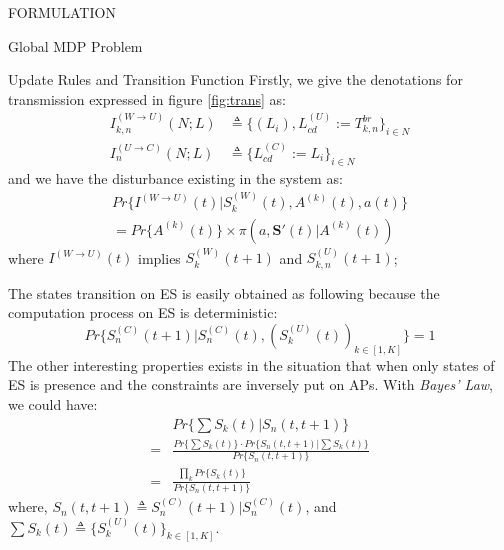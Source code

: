 \documentclass[10pt, conference, letterpaper]{IEEEtran}
\begin{document}
\begin{section}{FORMULATION}
\begin{subsection}{Global MDP Problem}
\begin{subsubsection}{Update Rules and Transition Function}
                Firstly, we give the denotations for transmission expressed in figure \ref{fig:trans} as:
                \begin{align}
                    I^{(W \to U)}_{k,n}(N;L) &\triangleq \{ (L_i),L^{(U)}_{cd}:=T^{br}_{k,n} \}_{i \in N}
                        \\
                    I^{(U \to C)}_{n}(N;L) &\triangleq \{ L^{(C)}_{cd}:=L_i \}_{i \in N}
                \end{align}
                and we have the disturbance existing in the system as:
                \begin{gather*}
                    Pr\{ I^{(W \to U)}(t) | S_{k}^{(W)}(t),A^{(k)}(t), a(t) \}
                    \\
                        = Pr\{ A^{(k)}(t) \} \times \pi(a, \mathbf{S}'(t)|A^{(k)}(t))
                \end{gather*}
                where $I^{(W \to U)}(t)$ implies $S^{(W)}_{k}(t+1)$ and $S^{(U)}_{k,n}(t+1)$;

                The states transition on ES is easily obtained as following because the computation process on ES is deterministic:
                $$
                Pr\{S_{n}^{(C)}(t+1) |S_{n}^{(C)}(t), (S_{k}^{(U)}(t))_{k \in [1,K]}  \} = 1
                $$
                The other interesting properties exists in the situation that when only states of ES is presence and the constraints are inversely put on APs. With \emph{Bayes' Law}, we could have:
                \begin{align*}
                    & Pr\{ \sum{S_k(t)} | S_n(t,t+1) \} \\
                    =& \frac{ Pr\{\sum{S_k(t)}\} \cdot Pr\{S_n(t,t+1)|\sum{S_k(t)}\} }{ Pr\{S_n(t,t+1)\} } \\
                    =& \frac{
                            \prod_k Pr\{S_k(t)\}
                        }{
                            Pr\{S_n(t,t+1)\}
                        }
                \end{align*}
                where, $S_n(t,t+1) \triangleq S_{n}^{(C)}(t+1) |S_{n}^{(C)}(t)$, and $\sum{S_k(t)} \triangleq \{S_{k}^{(U)}(t)\}_{k \in [1,K]}$.
            \end{subsubsection}


\end{subsection}
\end{section}
\end{document}
